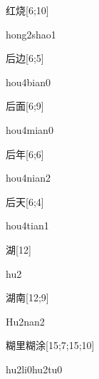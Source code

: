\begin{verbete}{红烧}[6;10]
\begin{pronuncia}{hong2shao1}
\end{pronuncia}
\end{verbete}

\begin{verbete}{后边}[6;5]
\begin{pronuncia}{hou4bian0}
\end{pronuncia}
\end{verbete}

\begin{verbete}{后面}[6;9]
\begin{pronuncia}{hou4mian0}
\end{pronuncia}
\end{verbete}

\begin{verbete}{后年}[6;6]
\begin{pronuncia}{hou4nian2}
\end{pronuncia}
\end{verbete}

\begin{verbete}{后天}[6;4]
\begin{pronuncia}{hou4tian1}
\end{pronuncia}
\end{verbete}

\begin{verbete}[hu2]{湖}[12]
\begin{pronuncia}{hu2}
\end{pronuncia}
\end{verbete}

\begin{verbete}[Hu2nan2]{湖南}[12;9]
\begin{pronuncia}{Hu2nan2}
\end{pronuncia}
\end{verbete}

\begin{verbete}[hu2li0hu2tu0]{糊里糊涂}[15;7;15;10]
\begin{pronuncia}[\\]{hu2li0hu2tu0}
\end{pronuncia}
\end{verbete}

